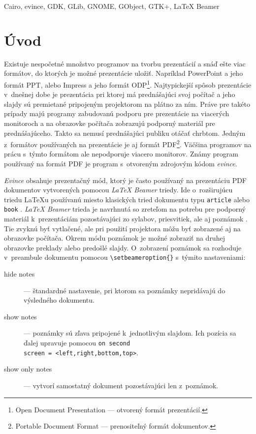 \documentclass[12pt,oneside,final]{fithesis2}
\begin{document}
\begin{ThesisKeyWords}
Cairo, evince, GDK, GLib, GNOME, GObject, GTK+, LaTeX Beamer
\end{ThesisKeyWords}
 
\MainMatter
\sloppy
\setcounter{tocdepth}{3}
\tableofcontents 
 
\chapter{Úvod}

Existuje nespočetné množstvo programov na tvorbu prezentácií a snáď ešte viac formátov, do ktorých je možné prezentácie uložiť. Napríklad PowerPoint a jeho formát PPT, alebo Impress a jeho formát ODP\footnote{Open Document Presentation --- otvorený formát prezentácií.}. Najtypickejší spôsob prezentácie v~dnešnej dobe je prezentácia pri ktorej má prednášajúci svoj počítač a jeho slajdy sú premietané pripojeným projektorom na plátno za ním. Práve pre takéto prípady majú programy zabudovanú podporu pre prezentácie na viacerých monitoroch a na obrazovke počítača zobrazujú podporný materiál pre prednášajúceho. Takto sa nemusí prednášajúci publiku otáčať chrbtom. Jedným z~formátov používaných na prezentácie je aj formát PDF\footnote{Portable Document Format --- prenositeľný formát dokumentov.}. Väčšina programov na prácu s~týmto formátom ale nepodporuje viacero monitorov. Známy program používaný na formát PDF je program s~otvoreným zdrojovým kódom \emph{evince}.

\emph{Evince} obsahuje prezentačný mód, ktorý je často používaný na prezentáciu PDF dokumentov vytvorených pomocou \emph{LaTeX Beamer} triedy. Ide o~rozširujúcu triedu LaTeXu používanú miesto klasických tried dokumentu typu \texttt{article} alebo \texttt{book} \cite{abclatex}. \emph{LaTeX Beamer} trieda je navrhnutá so zreteľom na potrebu pre podporný materiál k~prezentáciám pozostávajúci zo sylabov, priesvitiek, ale aj poznámok \cite{beamer}. Tie zvyknú byť vytlačené, ale pri použití projektora môžu byť zobrazené aj na obrazovke počítača. Okrem módu poznámok je možné zobraziť na druhej obrazovke preklady alebo predošlé slajdy. O~zobrazení poznámok sa rozhoduje v~preambule dokumentu pomocou \verb|\setbeameroption{}| s~týmito nastaveniami:
\begin{description}
\item[hide notes] --- štandardné nastavenie, pri ktorom sa poznámky nepridávajú do výsledného dokumentu.
\item[show notes] --- poznámky sú zľava pripojené k~jednotlivým slajdom. Ich pozícia sa ďalej upravuje pomocou \texttt{on second \\ screen = <left,right,bottom,top>}.
\item[show only notes]  --- vytvorí samostatný dokument pozostávajúci len z~poznámok.
\end{description}
\end{document}
